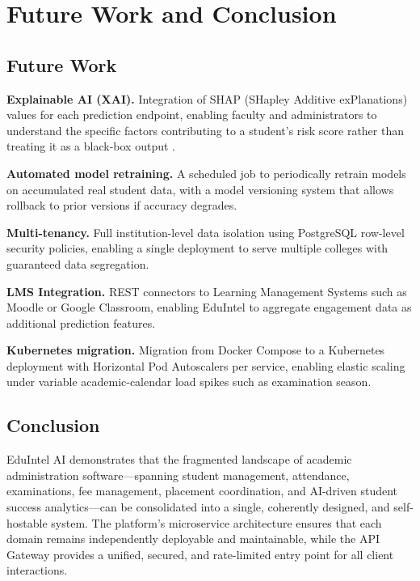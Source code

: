 \documentclass[conference]{IEEEtran}
\begin{document}
\section{Future Work and Conclusion}

\subsection{Future Work}

\textbf{Explainable AI (XAI).} Integration of SHAP (SHapley Additive
exPlanations) values for each prediction endpoint, enabling faculty and
administrators to understand the specific factors contributing to a student's
risk score rather than treating it as a black-box output \cite{guidotti2019}.

\textbf{Automated model retraining.} A scheduled job to periodically retrain
models on accumulated real student data, with a model versioning system that
allows rollback to prior versions if accuracy degrades.

\textbf{Multi-tenancy.} Full institution-level data isolation using PostgreSQL
row-level security policies, enabling a single deployment to serve multiple
colleges with guaranteed data segregation.

\textbf{LMS Integration.} REST connectors to Learning Management Systems such
as Moodle or Google Classroom, enabling EduIntel to aggregate engagement data as
additional prediction features.

\textbf{Kubernetes migration.} Migration from Docker Compose to a Kubernetes
deployment with Horizontal Pod Autoscalers per service, enabling elastic scaling
under variable academic-calendar load spikes such as examination season.

\subsection{Conclusion}

EduIntel AI demonstrates that the fragmented landscape of academic
administration software---spanning student management, attendance, examinations,
fee management, placement coordination, and AI-driven student success
analytics---can be consolidated into a single, coherently designed, and
self-hostable system. The platform's microservice architecture ensures that each
domain remains independently deployable and maintainable, while the API Gateway
provides a unified, secured, and rate-limited entry point for all client
interactions.
\end{document}
